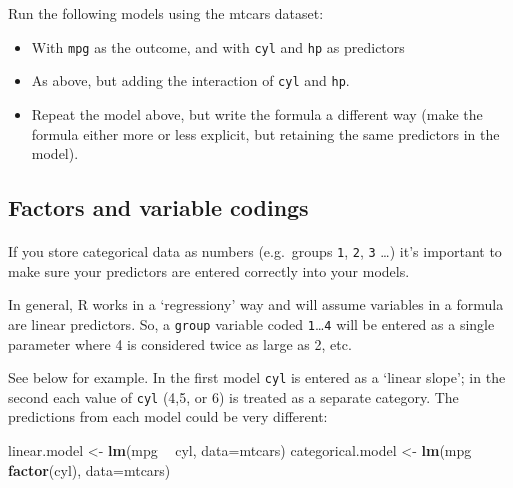 \documentclass[]{article}
\newenvironment{Shaded}{\begin{snugshade}}{\end{snugshade}}
\newcommand{\KeywordTok}[1]{\textcolor[rgb]{0.13,0.29,0.53}{\textbf{#1}}}
\newcommand{\DataTypeTok}[1]{\textcolor[rgb]{0.13,0.29,0.53}{#1}}
\newcommand{\StringTok}[1]{\textcolor[rgb]{0.31,0.60,0.02}{#1}}
\newcommand{\OperatorTok}[1]{\textcolor[rgb]{0.81,0.36,0.00}{\textbf{#1}}}
\newcommand{\NormalTok}[1]{#1}
\let\oldparagraph\paragraph
\renewcommand{\paragraph}[1]{\oldparagraph{#1}\mbox{}}
\theoremstyle{definition}
\theoremstyle{definition}
\theoremstyle{definition}
\theoremstyle{remark}
\begin{document}
Run the following models using the mtcars dataset:

\begin{itemize}
\item
  With \texttt{mpg} as the outcome, and with \texttt{cyl} and
  \texttt{hp} as predictors
\item
  As above, but adding the interaction of \texttt{cyl} and \texttt{hp}.
\item
  Repeat the model above, but write the formula a different way (make
  the formula either more or less explicit, but retaining the same
  predictors in the model).
\end{itemize}

\subsection*{Factors and variable
codings}\label{factors-and-variable-codings}

\hypertarget{factors-vs-linear-inputs}{\paragraph{}\label{factors-vs-linear-inputs}}

If you store categorical data as numbers (e.g.~groups \texttt{1},
\texttt{2}, \texttt{3} \ldots{}) it's important to make sure your
predictors are entered correctly into your models.

In general, R works in a `regressiony' way and will assume variables in
a formula are linear predictors. So, a \texttt{group} variable coded
\texttt{1}\ldots{}\texttt{4} will be entered as a single parameter where
4 is considered twice as large as 2, etc.

See below for example. In the first model \texttt{cyl} is entered as a
`linear slope'; in the second each value of \texttt{cyl} (4,5, or 6) is
treated as a separate category. The predictions from each model could be
very different:

\begin{Shaded}
\begin{Highlighting}[]
\NormalTok{linear.model <-}\StringTok{ }\KeywordTok{lm}\NormalTok{(mpg }\OperatorTok{~}\StringTok{ }\NormalTok{cyl, }\DataTypeTok{data=}\NormalTok{mtcars)}
\NormalTok{categorical.model <-}\StringTok{ }\KeywordTok{lm}\NormalTok{(mpg }\OperatorTok{~}\StringTok{ }\KeywordTok{factor}\NormalTok{(cyl), }\DataTypeTok{data=}\NormalTok{mtcars)}
\end{Highlighting}
\end{Shaded}
\end{document}
